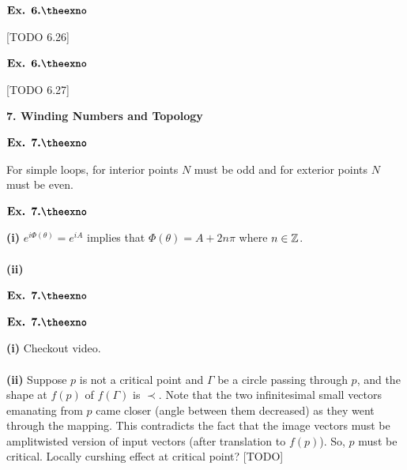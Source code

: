 \documentclass{article}
\def\tf{\textbf}
\def\mb{\ensuremath\mathbb}
\def\Z{\ensuremath\mb{Z}}
\newcounter{exno}
\begin{document}
\vspace{0.2in}

${\textbf{Ex. 6.\theexno}}$
\addtocounter{exno}{1}

[TODO 6.26]

\vspace{0.2in}

${\textbf{Ex. 6.\theexno}}$
\addtocounter{exno}{1}

[TODO 6.27]

\vspace{0.2in}

\clearpage
\setcounter{exno}{1}

\begin{center}
    \textbf{\large{7. Winding Numbers and Topology}}
\end{center}


${\textbf{Ex. 7.\theexno}}$
\addtocounter{exno}{1}

For simple loops, for interior points $N$ must be odd and for exterior points $N$ must be even.

\vspace{0.2in}

${\textbf{Ex. 7.\theexno}}$
\addtocounter{exno}{1}

\tf{(i)} $e^{i\Phi(\theta)} = e^{iA}$ implies that $\Phi(\theta) = A + 2n\pi$ where $n \in \Z$.\\~\\

\tf{(ii)} 

\vspace{0.2in}

${\textbf{Ex. 7.\theexno}}$
\addtocounter{exno}{1}

\vspace{0.2in}

${\textbf{Ex. 7.\theexno}}$
\addtocounter{exno}{1}

\tf{(i)} Checkout video.\\~\\

\tf{(ii)} Suppose $p$ is not a critical point and $\Gamma$ be a circle passing through $p$, and the shape at $f(p)$ of $f(\Gamma)$ is $\prec$. Note that the two infinitesimal small vectors emanating from $p$ came closer (angle between them decreased) as they went through the mapping. This contradicts the fact that the image vectors must be amplitwisted version of input vectors (after translation to $f(p)$). So, $p$ must be critical. Locally curshing effect at critical point? [TODO]\\~\\
\end{document}
